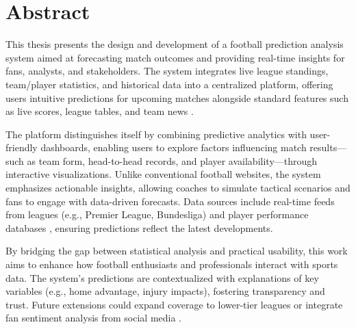 \cleardoublepage
{}
{}
\begingroup
\let\clearpage\relax
\let\cleardoublepage\relax
\let\cleardoublepage\relax

\chapter*{Abstract}

This thesis presents the design and development of a football prediction analysis system aimed at forecasting match outcomes and providing real-time insights for fans, analysts, and stakeholders. The system integrates live league standings, team/player statistics, and historical data into a centralized platform, offering users intuitive predictions for upcoming matches alongside standard features such as live scores, league tables, and team news \cite{premier, transfermarkt, whoscored}.  

The platform distinguishes itself by combining predictive analytics with user-friendly dashboards, enabling users to explore factors influencing match results—such as team form, head-to-head records, and player availability—through interactive visualizations. Unlike conventional football websites, the system emphasizes actionable insights, allowing coaches to simulate tactical scenarios and fans to engage with data-driven forecasts. Data sources include real-time feeds from leagues (e.g., Premier League, Bundesliga) and player performance databases \cite{livescore, flashscore}, ensuring predictions reflect the latest developments.  

By bridging the gap between statistical analysis and practical usability, this work aims to enhance how football enthusiasts and professionals interact with sports data. The system’s predictions are contextualized with explanations of key variables (e.g., home advantage, injury impacts), fostering transparency and trust. Future extensions could expand coverage to lower-tier leagues or integrate fan sentiment analysis from social media \cite{squawka, athletic}.  



\endgroup

\vfill